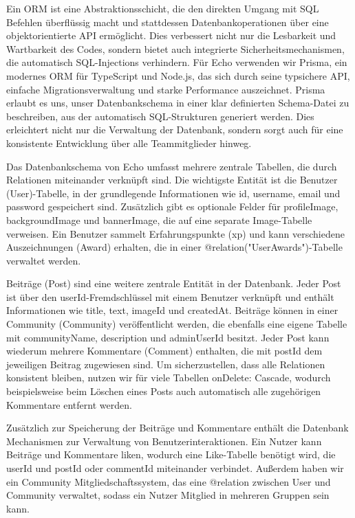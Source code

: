 \documentclass[a4paper,12pt]{article}
\begin{document}
Ein ORM ist eine Abstraktionsschicht, die den direkten Umgang mit SQL Befehlen
überflüssig macht und stattdessen Datenbankoperationen über eine
objektorientierte API ermöglicht. Dies verbessert nicht nur die Lesbarkeit und
Wartbarkeit des Codes, sondern bietet auch integrierte Sicherheitsmechanismen,
die automatisch SQL-Injections verhindern. Für Echo verwenden wir Prisma, ein
modernes ORM für TypeScript und Node.js, das sich durch seine typsichere API,
einfache Migrationsverwaltung und starke Performance auszeichnet. Prisma
erlaubt es uns, unser Datenbankschema in einer klar definierten Schema-Datei zu
beschreiben, aus der automatisch SQL-Strukturen generiert werden. Dies
erleichtert nicht nur die Verwaltung der Datenbank, sondern sorgt auch für eine
konsistente Entwicklung über alle Teammitglieder hinweg.

Das Datenbankschema von Echo umfasst mehrere zentrale Tabellen, die durch
Relationen miteinander verknüpft sind. Die wichtigste Entität ist die Benutzer
(User)-Tabelle, in der grundlegende Informationen wie id, username, email und
password gespeichert sind. Zusätzlich gibt es optionale Felder für
profileImage, backgroundImage und bannerImage, die auf eine separate
Image-Tabelle verweisen. Ein Benutzer sammelt Erfahrungspunkte (xp) und kann
verschiedene Auszeichnungen (Award) erhalten, die in einer
@relation("UserAwards")-Tabelle verwaltet werden.

Beiträge (Post) sind eine weitere zentrale Entität in der Datenbank. Jeder Post
ist über den userId-Fremdschlüssel mit einem Benutzer verknüpft und enthält
Informationen wie title, text, imageId und createdAt. Beiträge können in einer
Community (Community) veröffentlicht werden, die ebenfalls eine eigene Tabelle
mit communityName, description und adminUserId besitzt. Jeder Post kann
wiederum mehrere Kommentare (Comment) enthalten, die mit postId dem jeweiligen
Beitrag zugewiesen sind. Um sicherzustellen, dass alle Relationen konsistent
bleiben, nutzen wir für viele Tabellen onDelete: Cascade, wodurch
beispielsweise beim Löschen eines Posts auch automatisch alle zugehörigen
Kommentare entfernt werden.

Zusätzlich zur Speicherung der Beiträge und Kommentare enthält die Datenbank
Mechanismen zur Verwaltung von Benutzerinteraktionen. Ein Nutzer kann Beiträge
und Kommentare liken, wodurch eine Like-Tabelle benötigt wird, die userId und
postId oder commentId miteinander verbindet. Außerdem haben wir ein
Community Mitgliedschaftssystem, das eine @relation zwischen User und Community
verwaltet, sodass ein Nutzer Mitglied in mehreren Gruppen sein kann.
\end{document}
